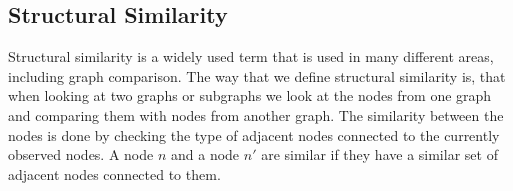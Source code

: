 \subsection{Structural Similarity}
\label{structural_similarity}
Structural similarity is a widely used term that is used in many different areas, including graph comparison. The way that we define structural similarity is, that when looking at two graphs or subgraphs we look at the nodes from one graph and comparing them with nodes from another graph. The similarity between the nodes is done by checking the type of adjacent nodes connected to the currently observed nodes. 
A node $n$ and a node $n'$ are similar if they have a similar set of adjacent nodes connected to them.
